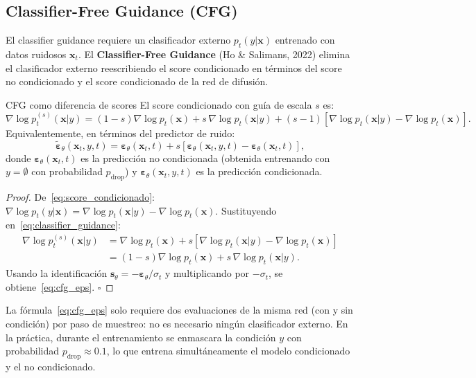 \subsection{Classifier-Free Guidance (CFG)}
\label{subsec:cfg}

El classifier guidance requiere un clasificador externo $p_t(y|\bm{x})$
entrenado con datos ruidosos $\bm{x}_t$. El \textbf{Classifier-Free Guidance}
(Ho \& Salimans, 2022) elimina el clasificador externo reescribiendo el score
condicionado en términos del score no condicionado y el score condicionado de
la red de difusión.

\begin{proposicion}{CFG como diferencia de scores}
\label{prop:cfg}
El score condicionado con guía de escala $s$ es:
\begin{equation}
  \nabla\log p_t^{(s)}(\bm{x}|y)
  = (1-s)\nabla\log p_t(\bm{x}) + s\,\nabla\log p_t(\bm{x}|y)
  + (s-1)[\nabla\log p_t(\bm{x}|y) - \nabla\log p_t(\bm{x})].
  \label{eq:cfg_score}
\end{equation}
Equivalentemente, en términos del predictor de ruido:
\begin{equation}
  \tilde{\bm{\varepsilon}}_\theta(\bm{x}_t,y,t)
  = \bm{\varepsilon}_\theta(\bm{x}_t,t)
  + s\left[\bm{\varepsilon}_\theta(\bm{x}_t,y,t)
    - \bm{\varepsilon}_\theta(\bm{x}_t,t)\right],
  \label{eq:cfg_eps}
\end{equation}
donde $\bm{\varepsilon}_\theta(\bm{x}_t,t)$ es la predicción no condicionada
(obtenida entrenando con $y = \emptyset$ con probabilidad $p_{\mathrm{drop}}$)
y $\bm{\varepsilon}_\theta(\bm{x}_t,y,t)$ es la predicción condicionada.
\end{proposicion}

\begin{proof}
De~\eqref{eq:score_condicionado}: $\nabla\log p_t(y|\bm{x}) = \nabla\log
p_t(\bm{x}|y) - \nabla\log p_t(\bm{x})$.
Sustituyendo en~\eqref{eq:classifier_guidance}:
\begin{align*}
  \nabla\log p_t^{(s)}(\bm{x}|y)
  &= \nabla\log p_t(\bm{x}) + s[\nabla\log p_t(\bm{x}|y) - \nabla\log p_t(\bm{x})]\\
  &= (1-s)\nabla\log p_t(\bm{x}) + s\,\nabla\log p_t(\bm{x}|y).
\end{align*}
Usando la identificación $\bm{s}_\theta = -\bm{\varepsilon}_\theta/\sigma_t$ y
multiplicando por $-\sigma_t$, se obtiene~\eqref{eq:cfg_eps}. $\square$
\end{proof}

La fórmula~\eqref{eq:cfg_eps} solo requiere dos evaluaciones de la misma red
(con y sin condición) por paso de muestreo: no es necesario ningún clasificador
externo. En la práctica, durante el entrenamiento se enmascara la condición $y$
con probabilidad $p_{\mathrm{drop}}\approx 0.1$, lo que entrena simultáneamente
el modelo condicionado y el no condicionado.

